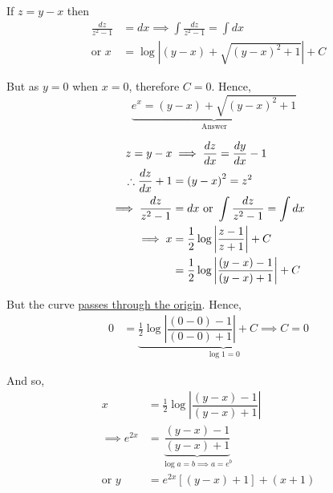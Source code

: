 \documentclass[14pt,fleqn]{extarticle}
\newcommand\ymx{\left(y-x \right)}
\begin{document}
\begin{problem}
\begin{step}
\begin{options}
     If $z = y-x$ then 
     \begin{align}
	\frac{dz}{z^2-1} &= dx \implies \int \frac{dz}{z^2-1} = \int dx \\
	\text{or } x &= \log\left\vert \ymx + \sqrt{\ymx^2 + 1}\right\vert + C
\end{align}

But as $y = 0$ when $x=0$, therefore $C = 0$. Hence, 
\[ \quad \underbrace{e^x = \ymx + \sqrt{\ymx^2 + 1}}_{\text{Answer}}\]   
    \end{options} 
     \reason 
     
     \begin{align}
     z = y -x &\implies \frac{dz}{dx} = \dydx - 1\\
     \therefore \frac{dz}{dx} + 1 &= \ymx^2 = z^2  \\
     \implies \frac{dz}{z^2 - 1} &= dx \text{ or } \int \frac{dz}{z^2 - 1} = \int dx \\
     \implies x &= \frac{1}{2} \log \left\vert \dfrac{z-1}{z + 1}\right\vert + C \\
     &= \frac{1}{2}\log \left\vert \dfrac{\ymx - 1}{\ymx+ 1} \right\vert + C 
\end{align}

But the curve \underline{passes through the origin}. Hence,
\begin{align}
0 &= \underbrace{\frac{1}{2}\log \left\vert\dfrac{(0-0) - 1}{(0-0) + 1} \right\vert + C \implies C = 0}_{\log 1 = 0}
\end{align}

And so, 
\begin{align}
x &= \frac{1}{2}\log\left\vert \dfrac{\ymx - 1}{\ymx + 1}\right\vert  \\
\implies e^{2x} &= \underbrace{\dfrac{\ymx - 1}{\ymx + 1}}_{\log a = b \implies a = e^b} \\
\text{or } y &= e^{2x} \left[\ymx+1 \right] + \left(x+1 \right)
\end{align}
       
\end{step}
\end{problem} 
\end{document}
